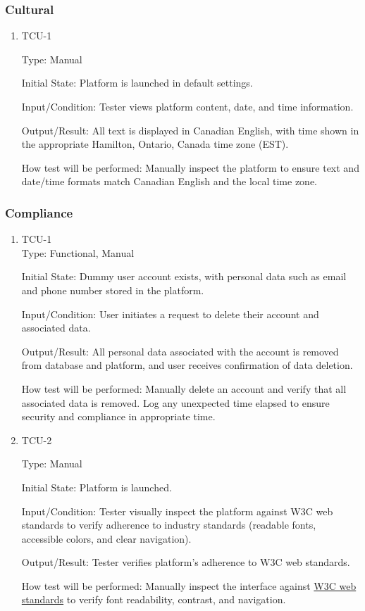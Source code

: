 \documentclass[12pt, titlepage]{article}
\begin{document}
\subsubsection{Cultural}

\begin{enumerate}

  \item{TCU-1\\}

        Type: Manual

        Initial State: Platform is launched in default settings.

        Input/Condition: Tester views platform content, date, and time information.

        Output/Result: All text is displayed in Canadian English, with time shown in the appropriate Hamilton, Ontario, Canada time zone (EST).

        How test will be performed: Manually inspect the platform to ensure text and date/time formats match Canadian English and the local time zone.
\end{enumerate}

\subsubsection{Compliance}
\begin{enumerate}
  \item{TCU-1\\}
        Type: Functional, Manual

        Initial State: Dummy user account exists, with personal data such as email and phone number stored in the platform.

        Input/Condition: User initiates a request to delete their account and associated data.

        Output/Result: All personal data associated with the account is removed from database and platform, and user receives confirmation of data deletion.

        How test will be performed: Manually delete an account and verify that all associated data is removed. Log any unexpected time elapsed to ensure security and compliance in appropriate time.

  \item{TCU-2\\}

        Type: Manual

        Initial State: Platform is launched.

        Input/Condition: Tester visually inspect the platform against W3C web standards to verify adherence to industry standards (readable fonts, accessible colors, and clear navigation).

        Output/Result: Tester verifies platform's adherence to W3C web standards.

        How test will be performed: Manually inspect the interface against \href{https://www.w3.org/standards/}{W3C web standards} to verify font readability, contrast, and navigation.
\end{enumerate}
\end{document}
